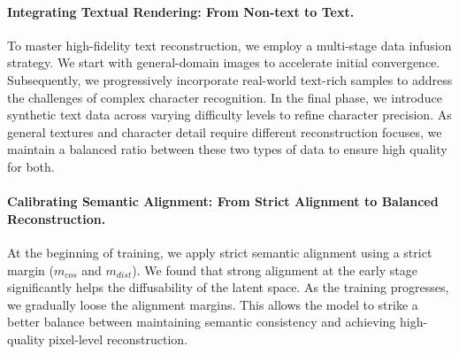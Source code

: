 \paragraph{Integrating Textual Rendering: From Non-text to Text.} 
To master high-fidelity text reconstruction, we employ a multi-stage data infusion strategy. We start with general-domain images to accelerate initial convergence. Subsequently, we progressively incorporate real-world text-rich samples to address the challenges of complex character recognition. In the final phase, we introduce synthetic text data across varying difficulty levels to refine character precision. As general textures and character detail require different reconstruction focuses, we maintain a balanced ratio between these two types of data to ensure high quality for both.

\paragraph{Calibrating Semantic Alignment: From Strict Alignment to Balanced Reconstruction.} 
At the beginning of training, we apply strict semantic alignment using a strict margin ($m_{cos}$ and $m_{dist}$). We found that strong alignment at the early stage significantly helps the diffusability of the latent space. As the training progresses, we gradually loose the alignment margins. This allows the model to strike a better balance between maintaining semantic consistency and achieving high-quality pixel-level reconstruction.
